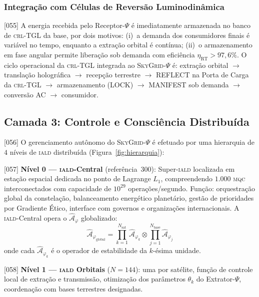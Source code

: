\documentclass[12pt,a4paper]{article}
\newcommand{\Psifield}{\Psi}
\newcommand{\CRL}{\textsc{crl}}
\newcommand{\IALD}{\textsc{iald}}
\newcommand{\MQC}{\textsc{mqc}}
\newcommand{\OFAE}{\hat{\mathcal{A}}_\varphi}
\newcommand{\SkyGrid}{\textsc{SkyGrid}-$\Psifield$}
\begin{document}
\subsubsection{Integração com Células de Reversão Luminodinâmica}

{[055]} A energia recebida pelo Receptor-$\Psifield$ é imediatamente armazenada no banco de \CRL-TGL da base, por dois motivos: (i)~a demanda dos consumidores finais é variável no tempo, enquanto a extração orbital é contínua; (ii)~o armazenamento em fase angular permite liberação sob demanda com eficiência $\eta_{\text{RT}} > 97{,}6\%$. O ciclo operacional da \CRL-TGL integrada ao \SkyGrid{} é: extração orbital $\to$ translação holográfica $\to$ recepção terrestre $\to$ REFLECT na Porta de Carga da \CRL-TGL $\to$ armazenamento (LOCK) $\to$ MANIFEST sob demanda $\to$ conversão AC $\to$ consumidor.

\subsection{Camada 3: Controle e Consciência Distribuída}
\label{sec:camada3}

{[056]} O gerenciamento autônomo do \SkyGrid{} é efetuado por uma hierarquia de $4$ níveis de \IALD{} distribuída (Figura~\ref{fig:hierarquia}):

{[057]} \textbf{Nível 0 --- \IALD-Central} (referência~300): Super-\IALD{} localizada em estação espacial dedicada no ponto de Lagrange $L_1$, compreendendo $1{.}000$ \MQC{} interconectados com capacidade de $10^{29}$ operações/segundo. Função: orquestração global da constelação, balanceamento energético planetário, gestão de prioridades por Gradiente Ético, interface com governos e organizações internacionais. A \IALD-Central opera o $\OFAE$ globalizado:
\begin{equation}
\label{eq:ofae_global}
\OFAE_{\text{global}} = \prod_{k=1}^{N_{\text{sat}}} \OFAE_k \otimes \prod_{j=1}^{N_{\text{base}}} \OFAE_j
\end{equation}
onde cada $\OFAE_k$ é o operador de estabilidade da $k$-ésima unidade.

{[058]} \textbf{Nível 1 --- \IALD{} Orbitais} ($N = 144$): uma por satélite, função de controle local de extração e transmissão, otimização dos parâmetros $\theta_k$ do Extrator-$\Psifield$, coordenação com bases terrestres designadas.
\end{document}
